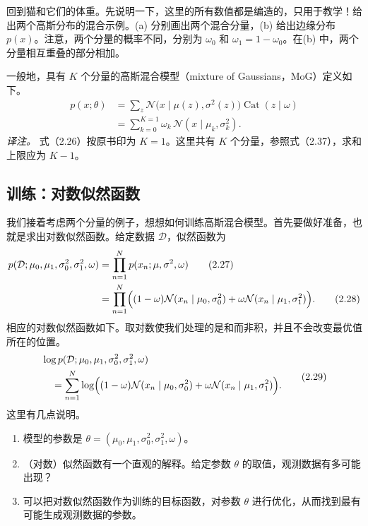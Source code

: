 回到猫和它们的体重。先说明一下，这里的所有数值都是编造的，只用于教学！给出两个高斯分布的混合示例。(a) 分别画出两个混合分量，(b) 给出边缘分布 $p(x)$。注意，两个分量的概率不同，分别为 $\omega_0$ 和 $\omega_1=1-\omega_0$。在(b) 中，两个分量相互重叠的部分相加。


一般地，具有 $K$ 个分量的高斯混合模型（mixture of Gaussians，MoG）定义如下。
\begin{align}
p(x;\theta)
 &=\sum_z\mathcal{N}\bigl(x\mid\mu(z),\sigma^2(z)\bigr)
                 \operatorname{Cat}(z\mid\omega)
                   \tag{2.25}\label{eq:02-25}\\
 &=\sum_{k=0}^{K=1}\omega_k\,\mathcal{N}(x\mid\mu_k,\sigma_k^2).
                   \tag{2.26}\label{eq:02-26}
\end{align}
\emph{译注。} 式（2.26）按原书印为 $K=1$。这里共有 $K$ 个分量，参照式（2.37），求和上限应为 $K-1$。

\subsection{训练：对数似然函数}
我们接着考虑两个分量的例子，想想如何训练高斯混合模型。首先要做好准备，也就是求出对数似然函数。给定数据 $\mathcal{D}$，似然函数为
\begin{align}
p(\mathcal{D};\mu_0,\mu_1,\sigma_0^2,\sigma_1^2,\omega)
 &=\prod_{n=1}^{N}p(x_n;\mu,\sigma^2,\omega)
                       \tag{2.27}\label{eq:02-27}\\
 &=\prod_{n=1}^{N}\Bigl(
     (1-\omega)\mathcal{N}(x_n\mid\mu_0,\sigma_0^2)
      +\omega\mathcal{N}(x_n\mid\mu_1,\sigma_1^2)\Bigr).
                       \tag{2.28}\label{eq:02-28}
\end{align}
相应的对数似然函数如下。取对数使我们处理的是和而非积，并且不会改变最优值所在的位置。
\begin{equation}
\begin{aligned}
&\log p(\mathcal{D};\mu_0,\mu_1,\sigma_0^2,\sigma_1^2,\omega)\\
&\quad=\sum_{n=1}^{N}\log\Bigl(
 (1-\omega)\mathcal{N}(x_n\mid\mu_0,\sigma_0^2)
 +\omega\mathcal{N}(x_n\mid\mu_1,\sigma_1^2)\Bigr).
\end{aligned}
\tag{2.29}\label{eq:02-29}
\end{equation}
这里有几点说明。
\begin{enumerate}
\item 模型的参数是 $\theta=(\mu_0,\mu_1,\sigma_0^2,\sigma_1^2,\omega)$。
\item （对数）似然函数有一个直观的解释。给定参数 $\theta$ 的取值，观测数据有多可能出现？
\item 可以把对数似然函数作为训练的目标函数，对参数 $\theta$ 进行优化，从而找到最有可能生成观测数据的参数。
\end{enumerate}

